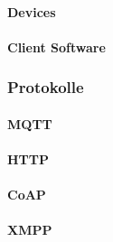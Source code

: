 \paragraph{Devices}

\paragraph{Client Software}

\subsubsection{Protokolle}

\paragraph{MQTT}

\paragraph{HTTP}

\paragraph{CoAP}

\paragraph{XMPP}

\newpage